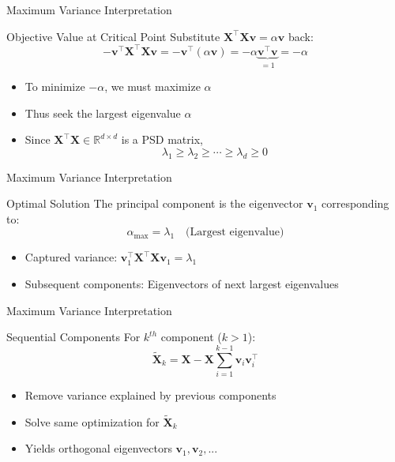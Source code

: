 \documentclass{beamer}
\begin{document}
\begin{frame}{Maximum Variance Interpretation}
    \begin{block}{Objective Value at Critical Point}
        Substitute $\mathbf{X}^\top \mathbf{X} \mathbf{v} = \alpha \mathbf{v}$ back:
        \[
        -\mathbf{v}^\top \mathbf{X}^\top \mathbf{X} \mathbf{v} = -\mathbf{v}^\top (\alpha \mathbf{v}) = -\alpha \underbrace{\mathbf{v}^\top \mathbf{v}}_{=1} = -\alpha
        \]
        \begin{itemize}
            \item To minimize $-\alpha$, we must maximize $\alpha$
            \item Thus seek the largest eigenvalue $\alpha$
            \item Since $ \mathbf{X}^\top \mathbf{X} \in \mathbb{R}^{d\times d}$ is a PSD matrix, 
            \[
            \lambda_1 \geq \lambda_2 \geq \cdots \geq \lambda_d \geq0
            \]
        \end{itemize}
    \end{block}
\end{frame}

\begin{frame}{Maximum Variance Interpretation}
    \begin{alertblock}{Optimal Solution}
        The principal component is the eigenvector $\mathbf{v}_1$ corresponding to:
        \[
        \alpha_{\text{max}} = \lambda_1 \quad \text{(Largest eigenvalue)}
        \]
        \begin{itemize}
            \item Captured variance: $\mathbf{v}_1^\top \mathbf{X}^\top \mathbf{X} \mathbf{v}_1 = \lambda_1$
            \item Subsequent components: Eigenvectors of next largest eigenvalues
        \end{itemize}
    \end{alertblock}
\end{frame}

\begin{frame}{Maximum Variance Interpretation}
    \begin{block}{Sequential Components}
        For $k^{th}$ component ($k > 1$):
        \[
        \tilde{\mathbf{X}}_k = \mathbf{X} - \mathbf{X}\sum_{i=1}^{k-1}\mathbf{v}_i\mathbf{v}_i^\top
        \]
        \begin{itemize}
            \item Remove variance explained by previous components
            \item Solve same optimization for $\tilde{\mathbf{X}}_k$
            \item Yields orthogonal eigenvectors $\mathbf{v}_1, \mathbf{v}_2, ...$
        \end{itemize}
    \end{block}
\end{frame}
\end{document}
